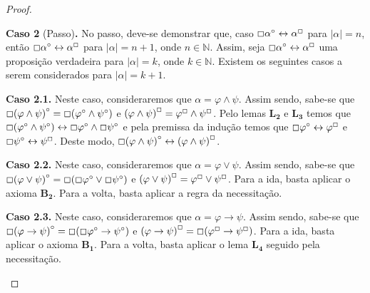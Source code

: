 \begin{theorem}
\begin{proof}
            \begin{case}
                \textbf{Caso 2} (Passo)\textbf{.} No passo, deve-se demonstrar que, caso $\Box\alpha^\circ\leftrightarrow\alpha^\Box$ para $|\alpha| = n$, 
                então $\Box\alpha^\circ\leftrightarrow\alpha^\Box$ para $|\alpha| = n + 1$, onde $n \in \mathbb{N}$. Assim, seja $\Box\alpha^\circ\leftrightarrow\alpha^\Box$ uma proposição verdadeira para $|\alpha| = k$, onde $k \in \mathbb{N}$. Existem os seguintes casos a serem considerados para $|\alpha| = k + 1$.
            \end{case}
    
                \begin{casee}
                    \textbf{Caso 2.1.}
                    Neste caso, consideraremos que $\alpha = \varphi\wedge\psi$.
                    Assim sendo, sabe-se que $\Box{(\varphi\wedge\psi)}^\circ=\Box(\varphi^\circ\wedge\psi^\circ)$ e ${(\varphi\wedge\psi)}^\Box=\varphi^\Box\wedge\psi^\Box$.
                    Pelo lemas $\mathbf{L_2}$ e $\mathbf{L_3}$ temos que $\Box(\varphi^\circ\wedge\psi^\circ)\leftrightarrow\Box\varphi^\circ\wedge\Box\psi^\circ$ e pela premissa da indução temos que $\Box\varphi^\circ\leftrightarrow\varphi^\Box$ e $\Box\psi^\circ\leftrightarrow\psi^\Box$.
                    Deste modo, $\Box{(\varphi\wedge\psi)}^\circ\leftrightarrow{(\varphi\wedge\psi)}^\Box$.
                \end{casee}
    
                \begin{casee}
                    \textbf{Caso 2.2.}
                    Neste caso, consideraremos que $\alpha = \varphi\vee\psi$.
                    Assim sendo, sabe-se que $\Box{(\varphi\vee\psi)}^\circ=\Box(\Box\varphi^\circ\vee\Box\psi^\circ)$ e ${(\varphi\vee\psi)}^\Box=\varphi^\Box\vee\psi^\Box$.
                    Para a ida, basta aplicar o axioma $\mathbf{B_2}$.
                    Para a volta, basta aplicar a regra da necessitação.
                \end{casee}
    
                \begin{casee}
                    \textbf{Caso 2.3.}
                    Neste caso, consideraremos que $\alpha=\varphi\to\psi$.
                    Assim sendo, sabe-se que $\Box{(\varphi\to\psi)}^\circ=\Box(\Box\varphi^\circ\to\psi^\circ)$ e ${(\varphi\to\psi)}^\Box=\Box(\varphi^\Box\to\psi^\Box)$.
                    Para a ida, basta aplicar o axioma $\mathbf{B_1}$.
                    Para a volta, basta aplicar o lema $\mathbf{L_4}$ seguido pela necessitação.
                    \qedhere
                \end{casee}
        \end{proof}
    \end{theorem}
